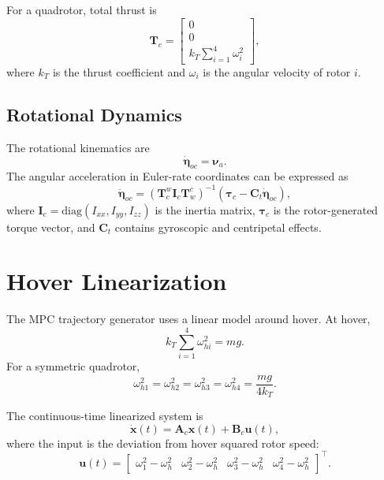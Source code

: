 \documentclass[12pt,a4paper]{article}
\begin{document}
For a quadrotor, total thrust is
\begin{equation}
\bm{T}_c =
\begin{bmatrix}
0\\
0\\
k_T\sum_{i=1}^{4}\omega_i^2
\end{bmatrix},
\end{equation}
where $k_T$ is the thrust coefficient and $\omega_i$ is the angular velocity of rotor $i$.

\subsection{Rotational Dynamics}

The rotational kinematics are
\begin{equation}
\dot{\bm{\eta}}_{oc}=\bm{\nu}_a.
\end{equation}
The angular acceleration in Euler-rate coordinates can be expressed as
\begin{equation}
\ddot{\bm{\eta}}_{oc}
=
\left(\bm{T}^{w}_{c}\bm{I}_{c}\bm{T}^{c}_{w}\right)^{-1}
\left(\bm{\tau}_{c}-\bm{C}_{t}\dot{\bm{\eta}}_{oc}\right),
\end{equation}
where $\bm{I}_{c}=\mathrm{diag}(I_{xx},I_{yy},I_{zz})$ is the inertia matrix, $\bm{\tau}_c$ is the rotor-generated torque vector, and $\bm{C}_{t}$ contains gyroscopic and centripetal effects.

\section{Hover Linearization}

The MPC trajectory generator uses a linear model around hover. At hover,
\begin{equation}
k_T\sum_{i=1}^{4}\omega_{hi}^{2}=mg.
\end{equation}
For a symmetric quadrotor,
\begin{equation}
\omega_{h1}^{2}=\omega_{h2}^{2}=\omega_{h3}^{2}=\omega_{h4}^{2}
=\frac{mg}{4k_T}.
\end{equation}

The continuous-time linearized system is
\begin{equation}
\dot{\bm{x}}(t)=\bm{A}_c\bm{x}(t)+\bm{B}_c\bm{u}(t),
\label{eq:continuous_linear_model}
\end{equation}
where the input is the deviation from hover squared rotor speed:
\begin{equation}
\bm{u}(t)=
\begin{bmatrix}
\omega_1^2-\omega_h^2 &
\omega_2^2-\omega_h^2 &
\omega_3^2-\omega_h^2 &
\omega_4^2-\omega_h^2
\end{bmatrix}^{\top}.
\end{equation}
\end{document}
